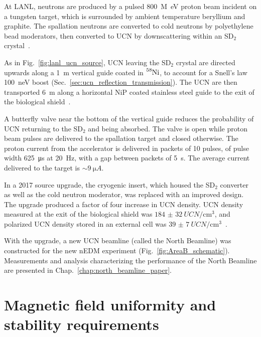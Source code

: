 At LANL, neutrons are produced by a pulsed \qty{800}{M\eV} proton beam incident on a tungsten target, which is surrounded by ambient temperature beryllium and graphite. The spallation neutrons are converted to cold neutrons by polyethylene bead moderators, then converted to UCN by downscattering within an SD$_2$ crystal~\cite{saunders_performance_2013}.

As in Fig.~\ref{fig:lanl_ucn_source}, UCN leaving the SD$_2$ crystal are directed upwards along a \qty{1}{\meter} vertical guide coated in $\ce{^{58}Ni}$, to account for a Snell's law \qty{100}{\nano\eV} boost (Sec.~\ref{sec:ucn_reflection_transmission}). The UCN are then transported \qty{6}{\meter} along a horizontal NiP coated stainless steel guide to the exit of the biological shield~\cite{ito_performance_2018}.

A butterfly valve near the bottom of the vertical guide reduces the probability of UCN returning to the SD$_2$ and being absorbed. The valve is open while proton beam pulses are delivered to the spallation target and closed otherwise. The proton current from the accelerator is delivered in packets of 10 pulses, of pulse width \qty{625}{\micro\s} at \qty{20}{\hertz}, with a gap between packets of \qty{5}{\s}. The average current delivered to the target is $\sim\qty{9}{\micro A}$.

In a 2017 source upgrade, the cryogenic insert, which housed the SD$_2$ converter as well as the cold neutron moderator, was replaced with an improved design. The upgrade produced a factor of four increase in UCN density. UCN density measured at the exit of the biological shield was $\qty{184(32)}{UCN\per \cm^3}$, and polarized UCN density stored in an external cell was $\qty{39(7)}{UCN\per \cm^3}$~\cite{ito_performance_2018}.

With the upgrade, a new UCN beamline (called the North Beamline) was constructed for the new nEDM experiment (Fig.~\ref{fig:AreaB_schematic}). Measurements and analysis characterizing the performance of the North Beamline are presented in Chap.~\ref{chap:north_beamline_paper}.



\section
{
    Magnetic field uniformity and stability requirements\label{sec:magnetic_field_req}
}


